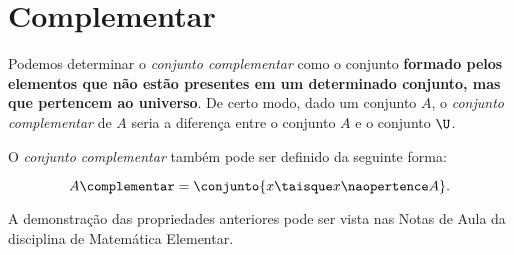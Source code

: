 \section{Complementar}
\label{sec:complementar}

Podemos determinar o \emph{conjunto complementar} como o conjunto \textbf{formado pelos elementos que não estão presentes em um determinado conjunto, mas que pertencem ao universo}. De certo modo, dado um conjunto $A$, o \emph{conjunto complementar} de $A$ seria a diferença entre o conjunto $A$ e o conjunto $\U$. 

O \emph{conjunto complementar} também pode ser definido da seguinte forma:

\[
	A\complementar = \conjunto{ x \taisque x \naopertence A}.
\]


\begin{remark}
    A demonstração das propriedades anteriores pode ser vista nas Notas de Aula da disciplina de Matemática Elementar\cite[pp. 9 - 10]{notas-de-aula}.
\end{remark}